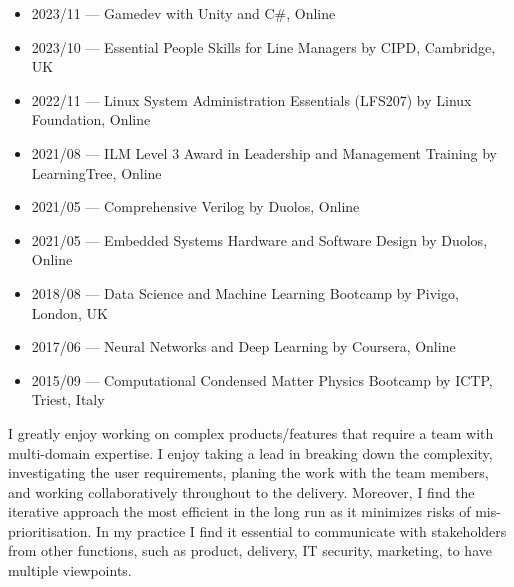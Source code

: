 \documentclass[10pt,a4paper,ragged2e,withhyper]{altacv}
\begin{document}
\begin{itemize}
    
    \item
    2023/11 --- Gamedev with Unity and C\#, Online
    
    \item
    2023/10 --- Essential People Skills for Line Managers by CIPD, Cambridge, UK

    \item
    2022/11 --- Linux System Administration Essentials (LFS207) by Linux Foundation, Online
    
    \item
    2021/08 --- ILM Level 3 Award in Leadership and Management Training by LearningTree, Online
    
    \item
    2021/05 --- Comprehensive Verilog by Duolos, Online
    
    \item
    2021/05 --- Embedded Systems Hardware and Software Design by Duolos, Online
    
    \item
    2018/08 --- Data Science and Machine Learning Bootcamp by Pivigo, London, UK
    
    \item
    2017/06 --- Neural Networks and Deep Learning by Coursera, Online
    
    \item
    2015/09 --- Computational Condensed Matter Physics Bootcamp by ICTP, Triest, Italy
    
\end{itemize}


I greatly enjoy working on complex products/features that require a team with multi-domain
expertise.
I enjoy taking a lead in breaking down the complexity, investigating the user requirements,
planing the work with the team members, and working collaboratively throughout to the delivery.
Moreover, I find the iterative approach the most efficient in the long run as it minimizes
risks of mis-prioritisation.
In my practice I find it essential to communicate with stakeholders from other functions, such as
product, delivery, IT security, marketing, to have multiple viewpoints.

\vspace{5px}
\end{document}
